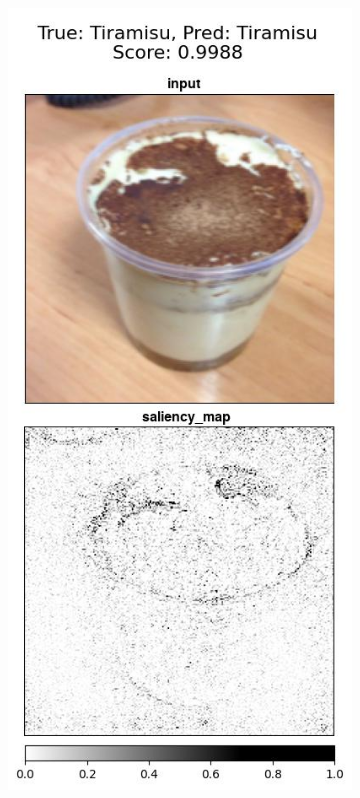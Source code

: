 \begin{figure}
 \centering
 \begin{subfigure}{.2\textwidth}
    \centering
    \includegraphics[width=\textwidth]{results/augment-img/19-0-98-none-Tiramisu-Tiramisu_vert.jpg}

\end{subfigure}
\end{figure}
